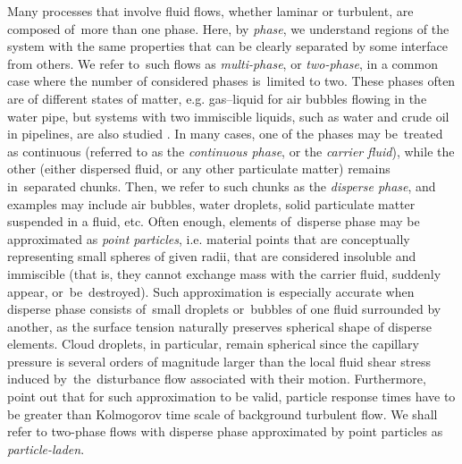 \documentclass{pracamgren}
\begin{document}
Many processes that involve fluid flows, whether laminar or turbulent, are composed of~more than one phase.
Here, by \emph{phase}, we understand regions of the system with the same properties that can be clearly separated by some interface from others.
We refer to~such flows as \emph{multi-phase}, or \emph{two-phase}, in a common case where the number of considered phases is~limited to two.
These phases often are of different states of matter, e.g. gas--liquid for air bubbles flowing in the water pipe, but systems with two immiscible liquids, such as water and crude oil in pipelines, are also studied \parencite{Brauner2003}.
In many cases, one of the phases may be~treated as continuous (referred to as the \emph{continuous phase}, or the \emph{carrier fluid}), while the other (either dispersed fluid, or any other particulate matter) remains in~separated chunks.
Then, we refer to such chunks as the \emph{disperse phase}, and examples may include air bubbles, water droplets, solid particulate matter suspended in a fluid, etc.
Often enough, elements of~disperse phase may be approximated as \emph{point particles}, i.e. material points that are conceptually representing small spheres of given radii, that are considered insoluble and immiscible (that is, they cannot exchange mass with the carrier fluid, suddenly appear, or~be~destroyed).
Such approximation is especially accurate when disperse phase consists of~small droplets or~bubbles of one fluid surrounded by another, as the surface tension naturally preserves spherical shape of disperse elements.
Cloud droplets, in particular, remain spherical since the capillary pressure is several orders of magnitude larger than the local fluid shear stress induced by~the~disturbance flow associated with their motion.
Furthermore, \textcite[Figure 1, therein]{Balachandar2010} point out that for such approximation to be valid, particle response times have to be greater than Kolmogorov time scale of background turbulent flow. 
We shall refer to two-phase flows with disperse phase approximated by point particles as \emph{particle-laden}.
\end{document}
